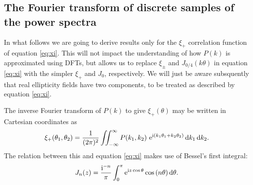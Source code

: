 \documentclass[preprint]{aastex}
\newcommand{\rmd}{\ensuremath{\mathrm{d}}}
\newcommand{\mi}{{\rm i}}
\newcommand{\me}{{\rm e}}
\begin{document}
\subsection{The Fourier transform of discrete samples of the power spectra}\label{sect:DFTPS}
In what follows we are going to derive results only for the $\xi_+$
correlation function of equation \eqref{eq:xi}.  This will not impact
the understanding of how $P(k)$ is approximated using DFTs, but allows
us to replace $\xi_{\pm}$ and $J_{0/4}(k \theta)$ in equation
\eqref{eq:xi} with the simpler $\xi_+$ and $J_0$, respectively.  We will just be aware subsquently that real ellipticity fields have two components, to be treated as described by equation \eqref{eq:xi}.

The inverse Fourier transform of $P(k)$ to give $\xi_+(\theta)$ may be written in Cartesian coordinates as
\begin{equation}
  \xi_{+}(\theta_1, \theta_2)  = \frac{1}{(2 \pi)^2} \int \! \! \!
  \int_{-\infty}^{\infty} P(k_1, k_2) ~ \me^{\mi (k_1 \theta_1 + k_2
  \theta_2)} \, \rmd k_1 \, \rmd k_2. \label{eq:xip}
\end{equation}
The relation between this and equation \eqref{eq:xi} makes use of Bessel's first
integral:
\begin{equation}
J_n(z) = \frac{\mi^{-n}}{\pi} \int_0^{\pi} \me^{\mi z \cos{\theta}}
\cos{(n \theta)} \, \rmd \theta.
\end{equation}
\end{document}
